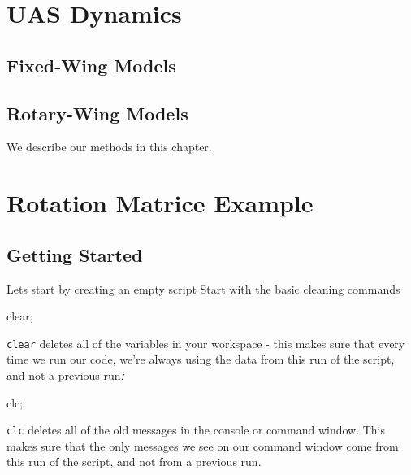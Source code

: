 \documentclass[
]{book}
\newenvironment{Shaded}{\begin{snugshade}}{\end{snugshade}}
\newcommand{\NormalTok}[1]{#1}
\theoremstyle{definition}
\theoremstyle{definition}
\theoremstyle{definition}
\theoremstyle{definition}
\theoremstyle{remark}
\begin{document}
\hypertarget{uas-dynamics}{%
\chapter{UAS Dynamics}\label{uas-dynamics}}

\hypertarget{fixed-wing-models}{%
\section{Fixed-Wing Models}\label{fixed-wing-models}}

\hypertarget{rotary-wing-models}{%
\section{Rotary-Wing Models}\label{rotary-wing-models}}

We describe our methods in this chapter.

\hypertarget{rotation-matrice-example}{%
\chapter{Rotation Matrice Example}\label{rotation-matrice-example}}

\hypertarget{getting-started}{%
\section{Getting Started}\label{getting-started}}

Lets start by creating an empty script Start with the basic cleaning commands

\begin{Shaded}
\begin{Highlighting}[]
\NormalTok{clear; }
\end{Highlighting}
\end{Shaded}

\texttt{clear} deletes all of the variables in your workspace - this makes sure that every time we run our code, we're always using the data from this run of the script, and not a previous run.`

\begin{Shaded}
\begin{Highlighting}[]
\NormalTok{clc; }
\end{Highlighting}
\end{Shaded}

\texttt{clc} deletes all of the old messages in the console or command window. This makes sure that the only messages we see on our command window come from this run of the script, and not from a previous run.
\end{document}
